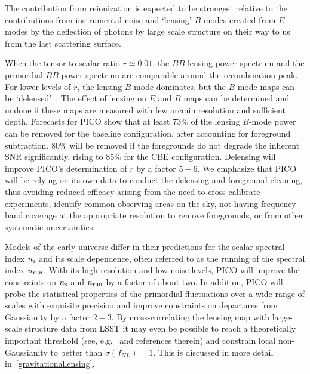 \documentclass[PICOReport.tex]{subfiles}
\begin{document}
The contribution from reionization is expected to be strongest relative to the contributions from instrumental noise and `lensing' $B$-modes created from $E$-modes by the deflection of photons by large scale structure on their way to us from the last scattering surface. 

When the tensor to scalar ratio $r \simeq 0.01$, the $BB$ lensing power spectrum and the primordial $BB$ power spectrum are comparable around the recombination peak. For lower levels of $r$, the lensing $B$-mode dominates, but the $B$-mode maps can be `delensed'~\citep{2004PhRvD..69d3005S,2012JCAP...06..014S}. The effect of lensing on $E$ and $B$ maps can be determined and undone if these maps are measured with few arcmin resolution and sufficient depth. Forecasts for PICO show that at least 73\% of the lensing $B$-mode power can be removed for the baseline configuration, after accounting for foreground subtraction. 80\% will be removed if the foregrounds do not degrade the inherent \ac{SNR} significantly, rising to 85\% for the CBE configuration. Delensing will improve PICO's determination of $r$ by a factor $5-6$. We emphasize that PICO will be relying on its own data to conduct the delensing and foreground cleaning, thus avoiding reduced efficacy arising from the need to cross-calibrate experiments, identify common observing areas on the sky, not having frequency band coverage at the appropriate resolution to remove foregrounds, or from other systematic uncertainties.



Models of the early universe  differ in their predictions for the scalar spectral index $n_{\rm s}$ and its scale dependence, often referred to as the running of the spectral index $n_{\rm run}$. With its high resolution and low noise levels, PICO will improve the constraints on $n_{\rm s}$ and $n_{\rm run}$ by a factor of about two. In addition, PICO will probe the statistical properties of the primordial fluctuations over a wide range of scales with exquisite precision and improve constraints on departures from Gaussianity by a factor $2-3$. By cross-correlating the lensing map with large-scale structure data from LSST it may even be possible to reach a theoretically important threshold (see, e.g.~\cite{2014arXiv1412.4671A} and references therein) and constrain local non-Gaussianity to better than $\sigma(f_{NL})=1$. This is discussed in more detail in~\ref{gravitationallensing}.
\end{document}

